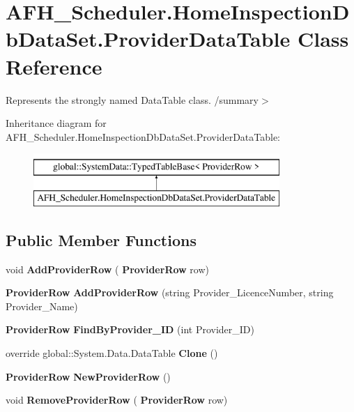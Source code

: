 \section{A\+F\+H\+\_\+\+Scheduler.\+Home\+Inspection\+Db\+Data\+Set.\+Provider\+Data\+Table Class Reference}
\label{class_a_f_h___scheduler_1_1_home_inspection_db_data_set_1_1_provider_data_table}


Represents the strongly named Data\+Table class. /summary$>$  


Inheritance diagram for A\+F\+H\+\_\+\+Scheduler.\+Home\+Inspection\+Db\+Data\+Set.\+Provider\+Data\+Table\+:\begin{figure}[H]
\begin{center}
\leavevmode
\includegraphics[height=2.000000cm]{class_a_f_h___scheduler_1_1_home_inspection_db_data_set_1_1_provider_data_table}
\end{center}
\end{figure}
\subsection*{Public Member Functions}
\begin{DoxyCompactItemize}
\item 
\mbox{\label{class_a_f_h___scheduler_1_1_home_inspection_db_data_set_1_1_provider_data_table_a2a031c1e1769073abf522fe3bb23c02e}} 
void {\bfseries Add\+Provider\+Row} (\textbf{ Provider\+Row} row)
\item 
\mbox{\label{class_a_f_h___scheduler_1_1_home_inspection_db_data_set_1_1_provider_data_table_aa04fb11f6ba533d712ab0cb09917fdb6}} 
\textbf{ Provider\+Row} {\bfseries Add\+Provider\+Row} (string Provider\+\_\+\+Licence\+Number, string Provider\+\_\+\+Name)
\item 
\mbox{\label{class_a_f_h___scheduler_1_1_home_inspection_db_data_set_1_1_provider_data_table_acfc2e50cf8c8836724b125e868958a43}} 
\textbf{ Provider\+Row} {\bfseries Find\+By\+Provider\+\_\+\+ID} (int Provider\+\_\+\+ID)
\item 
\mbox{\label{class_a_f_h___scheduler_1_1_home_inspection_db_data_set_1_1_provider_data_table_ad4ca5b68a83ab76e98f5db2f124b8982}} 
override global\+::\+System.\+Data.\+Data\+Table {\bfseries Clone} ()
\item 
\mbox{\label{class_a_f_h___scheduler_1_1_home_inspection_db_data_set_1_1_provider_data_table_a85a400614d68f707c5b868a2215e756e}} 
\textbf{ Provider\+Row} {\bfseries New\+Provider\+Row} ()
\item 
\mbox{\label{class_a_f_h___scheduler_1_1_home_inspection_db_data_set_1_1_provider_data_table_a8df2c1dd96653423a1d4a560af4ec0bd}} 
void {\bfseries Remove\+Provider\+Row} (\textbf{ Provider\+Row} row)
\end{DoxyCompactItemize}
